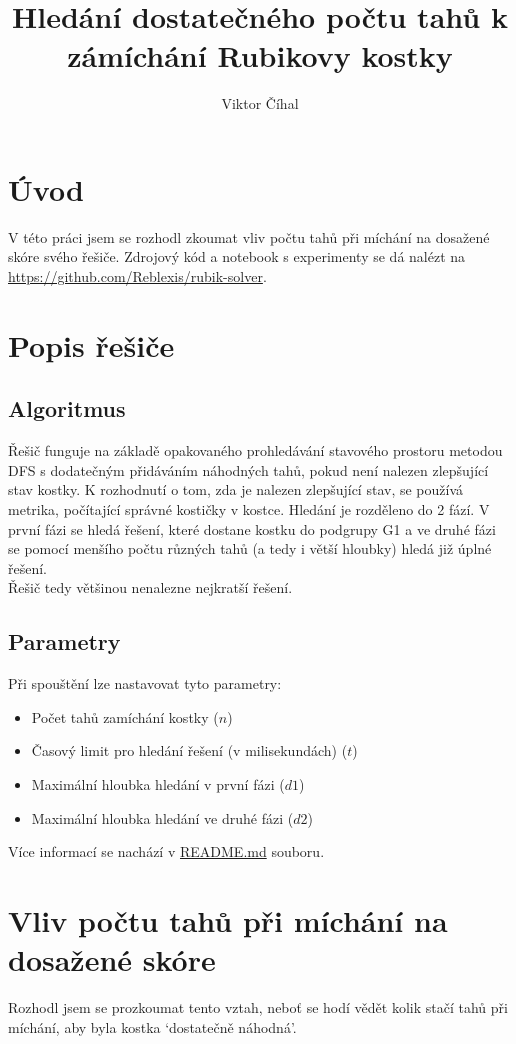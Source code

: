 \documentclass{article}
\title{Hledání dostatečného počtu tahů k zámíchání Rubikovy kostky}
\author{Viktor Číhal}
\date{}
\begin{document}
\maketitle
\section*{Úvod}
V této práci jsem se rozhodl zkoumat vliv počtu tahů při míchání na dosažené skóre svého řešiče.
Zdrojový kód a notebook s experimenty se dá nalézt na \url{https://github.com/Reblexis/rubik-solver}.

\section*{Popis řešiče}
\subsection*{Algoritmus}
Řešič funguje na základě opakovaného prohledávání stavového prostoru metodou DFS
s dodatečným přidáváním náhodných tahů, pokud není nalezen zlepšující stav kostky.
K rozhodnutí o tom, zda je nalezen zlepšující stav, se používá metrika, počítající
správné kostičky v kostce. Hledání je rozděleno do 2 fází. V první fázi se hledá
řešení, které dostane kostku do podgrupy G1 a ve druhé fázi se pomocí menšího počtu
různých tahů (a tedy i větší hloubky) hledá již úplné řešení.\\
Řešič tedy většinou nenalezne nejkratší řešení.

\subsection*{Parametry}
Při spouštění lze nastavovat tyto parametry:
\begin{itemize}
    \item Počet tahů zamíchání kostky ($n$)
    \item Časový limit pro hledání řešení (v milisekundách) ($t$)
    \item Maximální hloubka hledání v první fázi ($d1$)
    \item Maximální hloubka hledání ve druhé fázi ($d2$)
\end{itemize}

Více informací se nachází v \href{https://github.com/Reblexis/rubik-solver/blob/main/README.md}{README.md} souboru.

\section*{Vliv počtu tahů při míchání na dosažené skóre}
Rozhodl jsem se prozkoumat tento vztah, neboť se hodí vědět kolik stačí tahů při míchání, aby byla kostka
`dostatečně náhodná'. \\
\end{document}
